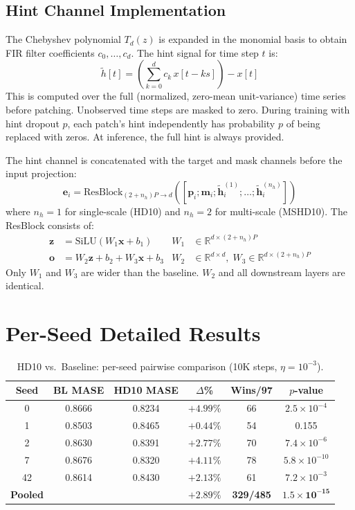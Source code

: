 \documentclass[11pt]{article}
\begin{document}
\subsection{Hint Channel Implementation}

The Chebyshev polynomial $T_d(z)$ is expanded in the monomial basis to obtain FIR filter coefficients $c_0, \ldots, c_d$. The hint signal for time step $t$ is:
\[
\tilde{h}[t] = \left(\sum_{k=0}^{d} c_k \, x[t - ks]\right) - x[t]
\]
This is computed over the full (normalized, zero-mean unit-variance) time series before patching. Unobserved time steps are masked to zero. During training with hint dropout $p$, each patch's hint independently has probability $p$ of being replaced with zeros. At inference, the full hint is always provided.

The hint channel is concatenated with the target and mask channels before the input projection:
\[
\mathbf{e}_i = \text{ResBlock}_{(2+n_h)P \to d}([\mathbf{p}_i; \mathbf{m}_i; \tilde{\mathbf{h}}^{(1)}_i; \ldots; \tilde{\mathbf{h}}^{(n_h)}_i])
\]
where $n_h = 1$ for single-scale (HD10) and $n_h = 2$ for multi-scale (MSHD10). The ResBlock consists of:
\begin{align}
\mathbf{z} &= \text{SiLU}(W_1 \mathbf{x} + b_1) & W_1 &\in \mathbb{R}^{d \times (2+n_h)P} \\
\mathbf{o} &= W_2 \mathbf{z} + b_2 + W_3 \mathbf{x} + b_3 & W_2 &\in \mathbb{R}^{d \times d}, \; W_3 \in \mathbb{R}^{d \times (2+n_h)P}
\end{align}
Only $W_1$ and $W_3$ are wider than the baseline. $W_2$ and all downstream layers are identical.

\section{Per-Seed Detailed Results}
\label{app:seeds}

\begin{table}[h]
\centering
\caption{HD10 vs.\ Baseline: per-seed pairwise comparison (10K steps, $\eta = 10^{-3}$).}
\small
\begin{tabular}{cccccc}
\toprule
\textbf{Seed} & \textbf{BL MASE} & \textbf{HD10 MASE} & \textbf{$\Delta$\%} & \textbf{Wins/97} & \textbf{$p$-value} \\
\midrule
0 & 0.8666 & 0.8234 & $+4.99\%$ & 66 & $2.5 \times 10^{-4}$ \\
1 & 0.8503 & 0.8465 & $+0.44\%$ & 54 & 0.155 \\
2 & 0.8630 & 0.8391 & $+2.77\%$ & 70 & $7.4 \times 10^{-6}$ \\
7 & 0.8676 & 0.8320 & $+4.11\%$ & 78 & $5.8 \times 10^{-10}$ \\
42 & 0.8614 & 0.8430 & $+2.13\%$ & 61 & $7.2 \times 10^{-3}$ \\
\midrule
\textbf{Pooled} & & & \textbf{$+2.89\%$} & \textbf{329/485} & $\mathbf{1.5 \times 10^{-15}}$ \\
\bottomrule
\end{tabular}
\end{table}
\end{document}

